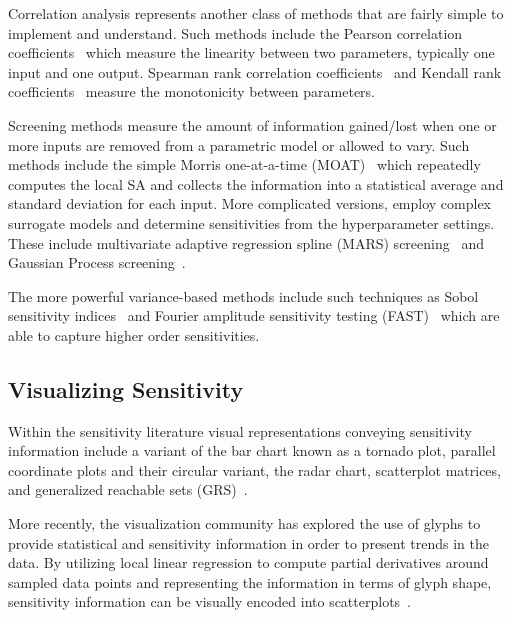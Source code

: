 Correlation analysis represents another class of methods that are fairly simple to implement and understand.
%
Such methods include the Pearson correlation coefficients~\cite{Pearson1895} which measure the linearity between two parameters, typically one input and one output.
%
Spearman rank correlation coefficients~\cite{Spearman1904} and Kendall rank coefficients~\cite{KendallGibbons1990} measure the monotonicity between parameters.

Screening methods measure the amount of information gained/lost when one or more inputs are removed from a parametric model or allowed to vary.
%
Such methods include the simple Morris one-at-a-time (MOAT)~\cite{Morris1991} which repeatedly computes the local SA and collects the information into a statistical average and standard deviation for each input.
%
More complicated versions, employ complex surrogate models and determine sensitivities from the hyperparameter settings.
%
These include multivariate adaptive regression spline (MARS) screening~\cite{Friedman1991} and Gaussian Process screening~\cite{RasmussenWilliams2006}.

The more powerful variance-based methods include such techniques as Sobol sensitivity indices~\cite{Sobol1993} and Fourier amplitude sensitivity testing (FAST)~\cite{CukierFortuinShuler1973} which are able to capture higher order sensitivities.

\subsection{Visualizing Sensitivity}
\label{sec:SA_visualization}
Within the sensitivity literature visual representations conveying sensitivity information include a variant of the bar chart known as a tornado plot, parallel coordinate plots and their circular variant, the radar chart, scatterplot matrices,  and generalized reachable sets (GRS)~\cite{SaltelliChanScott2000,BushenkovChernykhKamenev1995}.

More recently, the visualization community has explored the use of glyphs to provide statistical and sensitivity information in order to present trends in the data.
%
By utilizing local linear regression to compute partial derivatives around sampled data points and representing the information in terms of glyph shape, sensitivity information can be visually encoded into scatterplots~\cite{CorreaChanMa2009, ChanCorreaMa2010, GuoWardRundensteiner2011, ChanCorreaMa2013}.

